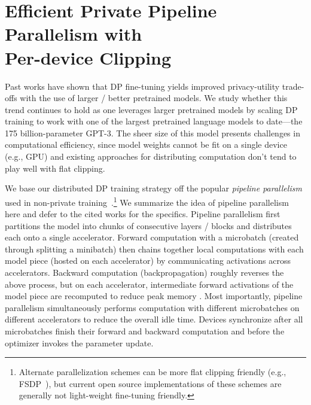 \section{Efficient Private Pipeline Parallelism with \\Per-device Clipping}
\label{sec:per_device_clipping}
Past works have shown that DP fine-tuning yields improved privacy-utility trade-offs with the use of larger / better pretrained models. 
We study whether this trend continues to hold as one leverages larger pretrained models by scaling DP training to work with one of the largest pretrained language models to date---the 175 billion-parameter GPT-3. 
The sheer size of this model presents challenges in computational efficiency, since model weights cannot be fit on a single device (e.g., GPU) and existing approaches for distributing computation don't tend to play well with flat clipping. 

We base our distributed DP training strategy off the popular \emph{pipeline parallelism} used in non-private training~\citep{huang2019gpipe,rasley2020deepspeed}.\footnote{Alternate parallelization schemes can be more flat clipping friendly (e.g., FSDP~\citep{fsdp}), but current open source implementations of these schemes are generally not light-weight fine-tuning friendly.}
We summarize the idea of pipeline parallelism here and defer to the cited works for the specifics. 
Pipeline parallelism first partitions the model into chunks of consecutive layers / blocks and distributes each onto a single accelerator. 
Forward computation with a microbatch (created through splitting a minibatch) then chains together local computations with each model piece (hosted on each accelerator) by communicating activations across accelerators. 
Backward computation (backpropagation) roughly reverses the above process, but on each accelerator, intermediate forward activations of the model piece are recomputed to reduce peak memory \cite[Section 2.3]{huang2019gpipe}.
Most importantly, pipeline parallelism simultaneously performs computation with different microbatches on different accelerators to reduce the overall idle time.
Devices synchronize after all microbatches finish their forward and backward computation and before the optimizer invokes the parameter update. 


